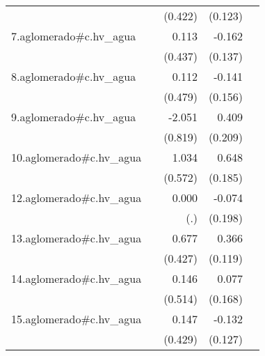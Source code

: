 {\begin{longtable}{l*{4}{D{.}{.}{-1}}}
            &                     &     (0.422)         &     (0.123)         &                     \\
\addlinespace
7.aglomerado#c.hv\_agua&                     &       0.113         &      -0.162         &                     \\
            &                     &     (0.437)         &     (0.137)         &                     \\
\addlinespace
8.aglomerado#c.hv\_agua&                     &       0.112         &      -0.141         &                     \\
            &                     &     (0.479)         &     (0.156)         &                     \\
\addlinespace
9.aglomerado#c.hv\_agua&                     &      -2.051\sym{*}  &       0.409         &                     \\
            &                     &     (0.819)         &     (0.209)         &                     \\
\addlinespace
10.aglomerado#c.hv\_agua&                     &       1.034         &       0.648\sym{***}&                     \\
            &                     &     (0.572)         &     (0.185)         &                     \\
\addlinespace
12.aglomerado#c.hv\_agua&                     &       0.000         &      -0.074         &                     \\
            &                     &         (.)         &     (0.198)         &                     \\
\addlinespace
13.aglomerado#c.hv\_agua&                     &       0.677         &       0.366\sym{**} &                     \\
            &                     &     (0.427)         &     (0.119)         &                     \\
\addlinespace
14.aglomerado#c.hv\_agua&                     &       0.146         &       0.077         &                     \\
            &                     &     (0.514)         &     (0.168)         &                     \\
\addlinespace
15.aglomerado#c.hv\_agua&                     &       0.147         &      -0.132         &                     \\
            &                     &     (0.429)         &     (0.127)         &                     \\

\end{longtable}}
